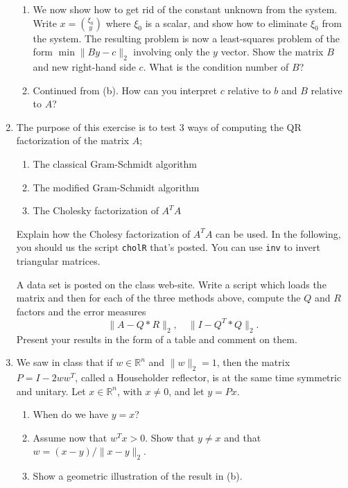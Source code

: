 \documentclass[11pt]{article}
\newcommand{\R}{\mathbb{R}}
\begin{document}
\begin{enumerate}
\begin{enumerate}
		      \item We now show how to get rid of the constant unknown from the system.  Write \(x = \binom{\xi_0}{y}\) where \(\xi_0\) is a scalar, and show how to eliminate \(\xi_0\) from the system.  The resulting problem is now a least-squares problem of the form \(\min \lVert By-c \rVert_2\) involving only the \(y\) vector.  Show the matrix \(B\) and new right-hand side \(c\).  What is the condition number of \(B\)?

		      \item Continued from (b).  How can you interpret \(c\) relative to \(b\) and \(B\) relative to \(A\)?
	      \end{enumerate}

	\item The purpose of this exercise is to test 3 ways of computing the QR factorization of the matrix \(A\);
	      \begin{enumerate}
		      \item The classical Gram-Schmidt algorithm
		      \item The modified Gram-Schmidt algorithm
		      \item The Cholesky factorization of \(A^T A\)
	      \end{enumerate}

	      Explain how the Cholesy factorization of \(A^T A\) can be used.  In the following, you should us the script \verb!cholR! that's posted.  You can use \verb!inv! to invert triangular matrices.

	      A data set is posted on the class web-site.  Write a script which loads the matrix and then for each of the three methods above, compute the \(Q\) and \(R\) factors and the error measures
	      \[\lVert A - Q * R \rVert_2, \quad \lVert I - Q^T * Q \rVert_2.\]
	      Present your results in the form of a table and comment on them.

	\item We saw in class that if \(w \in \R^n\) and \(\lVert w \rVert_2 = 1\), then the matrix \(P = I - 2ww^T\), called a Householder reflector, is at the same time symmetric and unitary.  Let \(x \in \R^n\), with \(x \neq 0\), and let \(y = Px\).
	      \begin{enumerate}
		      \item When do we have \(y = x\)?
		      \item Assume now that \(w^T x > 0\).  Show that \(y \neq x\) and that \(w = (x-y)/\lVert x-y \rVert_2\).
		      \item Show a geometric illustration of the result in (b).
	      \end{enumerate}


\end{enumerate}
\end{document}
